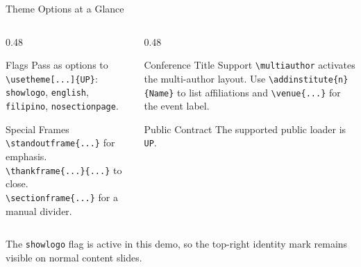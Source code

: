 \documentclass[aspectratio=169]{beamer}
\begin{document}
\begin{frame}{Theme Options at a Glance}
  \begin{columns}[T]
    \begin{column}{0.48\textwidth}
      \begin{block}{Flags} \footnotesize
        Pass as options to \texttt{\textbackslash usetheme[...]}\texttt{\{UP\}}:
        \texttt{showlogo}, \texttt{english}, \texttt{filipino}, \texttt{nosectionpage}.
      \end{block}
      \vskip 6pt
      \begin{block}{Special Frames} \footnotesize
        \texttt{\textbackslash standoutframe\{...\}} for emphasis.\\
        \texttt{\textbackslash thankframe\{...\}\{...\}} to close.\\
        \texttt{\textbackslash sectionframe\{...\}} for a manual divider.
      \end{block}
    \end{column}
    \begin{column}{0.48\textwidth} \footnotesize
      \begin{block}{Conference Title Support}
        \texttt{\textbackslash multiauthor} activates the multi-author layout.
        Use \texttt{\textbackslash addinstitute\{n\}\{Name\}} to list affiliations
        and \texttt{\textbackslash venue\{...\}} for the event label.
      \end{block}
      \vskip 6pt
      \begin{exampleblock}{Public Contract}
        The supported public loader is \texttt{UP}.
      \end{exampleblock}
    \end{column}
  \end{columns}

  \vskip 10pt
  The \texttt{showlogo} flag is active in this demo, so the top-right identity mark
  remains visible on normal content slides.
\end{frame}
\end{document}
